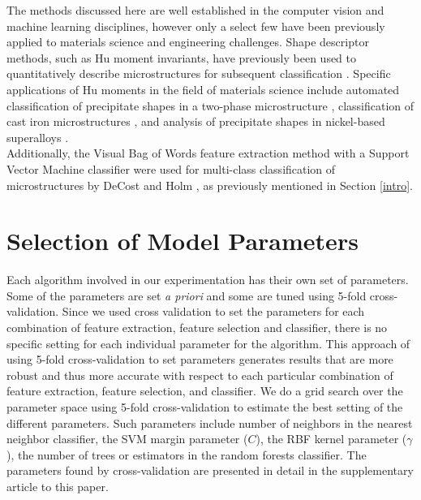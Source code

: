The methods discussed here are well established in the computer vision and machine learning disciplines, however only a select few have been previously applied to materials science and engineering challenges.  Shape descriptor methods, such as Hu moment invariants, have previously been used to quantitatively describe microstructures for subsequent classification \cite{Pattan2010, Prakash2011, Kumara,MacSleyne2008,Sluytman2012}.  
%
Specific applications of Hu moments in the field of materials science include automated classification of precipitate shapes in a two-phase microstructure \cite{MacSleyne2008}, classification of cast iron microstructures \cite{Pattan2010,Prakash2011,Kumara}, and analysis of precipitate shapes in nickel-based superalloys \cite{Sluytman2012}.\\

%
Additionally, the Visual Bag of Words feature extraction method with a Support Vector Machine classifier were used for multi-class classification of microstructures by DeCost and Holm \cite{DeCost2015}, as previously mentioned in Section \ref{intro}. 

\section{Selection of Model Parameters}
Each algorithm involved in our experimentation has their own set of parameters. Some of the parameters are set \textit{a priori} and some are tuned using 5-fold cross-validation. Since we used cross validation to set the parameters for each combination of feature extraction, feature selection and classifier, there is no specific setting for each individual parameter for the algorithm. This approach of using 5-fold cross-validation to set parameters generates results that are more robust and thus more accurate with respect to each particular combination of feature extraction, feature selection, and classifier. We do a grid search over the parameter space using 5-fold cross-validation to estimate the best setting of the different parameters. Such parameters include number of neighbors in the nearest neighbor classifier, the SVM margin parameter ($C$), the RBF kernel parameter  ($\gamma$), the number of trees or estimators in the random forests classifier. The parameters found by cross-validation are presented in detail in the supplementary article to this paper.

